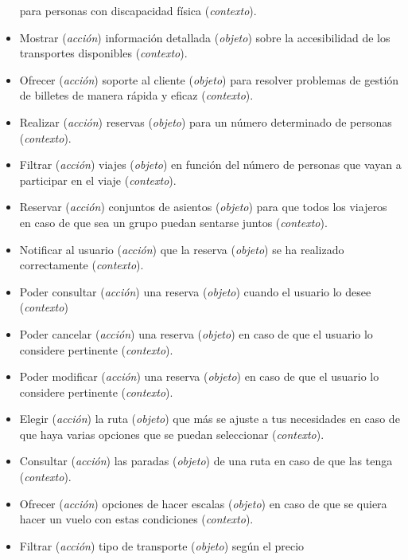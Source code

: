 \begin{itemize}
            para personas con discapacidad física (\textit{contexto}).
      \item Mostrar (\textit{acción}) información detallada (\textit{objeto}) sobre la
            accesibilidad de los transportes disponibles (\textit{contexto}).
      \item Ofrecer (\textit{acción}) soporte al cliente (\textit{objeto}) para resolver
            problemas de gestión de billetes de manera rápida y eficaz (\textit{contexto}).
      \item Realizar (\textit{acción}) reservas (\textit{objeto}) para un número
            determinado de personas (\textit{contexto}).
      \item Filtrar (\textit{acción}) viajes (\textit{objeto}) en función del número de
            personas que vayan a participar en el viaje (\textit{contexto}).
      \item Reservar (\textit{acción}) conjuntos de asientos (\textit{objeto}) para que
            todos los viajeros en caso de que sea un grupo puedan sentarse juntos
            (\textit{contexto}).
      \item Notificar al usuario (\textit{acción}) que la reserva (\textit{objeto}) se ha
            realizado correctamente (\textit{contexto}).
      \item Poder consultar (\textit{acción}) una reserva (\textit{objeto}) cuando el
            usuario lo desee (\textit{contexto})
      \item Poder cancelar (\textit{acción}) una reserva (\textit{objeto}) en caso de que
            el usuario lo considere pertinente (\textit{contexto}).
      \item Poder modificar (\textit{acción}) una reserva (\textit{objeto}) en caso de que
            el usuario lo considere pertinente (\textit{contexto}).
      \item Elegir (\textit{acción}) la ruta (\textit{objeto}) que más se ajuste a tus
            necesidades en caso de que haya varias opciones que se puedan seleccionar
            (\textit{contexto}).
      \item Consultar (\textit{acción}) las paradas (\textit{objeto}) de una ruta en caso
            de que las tenga (\textit{contexto}).
      \item Ofrecer (\textit{acción}) opciones de hacer escalas (\textit{objeto}) en caso
            de que se quiera hacer un vuelo con estas condiciones (\textit{contexto}).
      \item Filtrar (\textit{acción}) tipo de transporte (\textit{objeto}) según el precio

\end{itemize}
